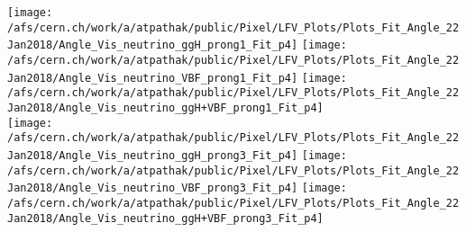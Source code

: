 \documentclass{beamer}
\begin{document}
\begin{frame}
\begin{normalsize}
\begin{center}
\texttt{[image: /afs/cern.ch/work/a/atpathak/public/Pixel/LFV\_Plots/Plots\_Fit\_Angle\_22Jan2018/Angle\_Vis\_neutrino\_ggH\_prong1\_Fit\_p4]}
\texttt{[image: /afs/cern.ch/work/a/atpathak/public/Pixel/LFV\_Plots/Plots\_Fit\_Angle\_22Jan2018/Angle\_Vis\_neutrino\_VBF\_prong1\_Fit\_p4]}
\texttt{[image: /afs/cern.ch/work/a/atpathak/public/Pixel/LFV\_Plots/Plots\_Fit\_Angle\_22Jan2018/Angle\_Vis\_neutrino\_ggH+VBF\_prong1\_Fit\_p4]}\\
\texttt{[image: /afs/cern.ch/work/a/atpathak/public/Pixel/LFV\_Plots/Plots\_Fit\_Angle\_22Jan2018/Angle\_Vis\_neutrino\_ggH\_prong3\_Fit\_p4]}
\texttt{[image: /afs/cern.ch/work/a/atpathak/public/Pixel/LFV\_Plots/Plots\_Fit\_Angle\_22Jan2018/Angle\_Vis\_neutrino\_VBF\_prong3\_Fit\_p4]}
\texttt{[image: /afs/cern.ch/work/a/atpathak/public/Pixel/LFV\_Plots/Plots\_Fit\_Angle\_22Jan2018/Angle\_Vis\_neutrino\_ggH+VBF\_prong3\_Fit\_p4]}\\
\end{center}
\end{normalsize}
\end {frame}
\end{document}
